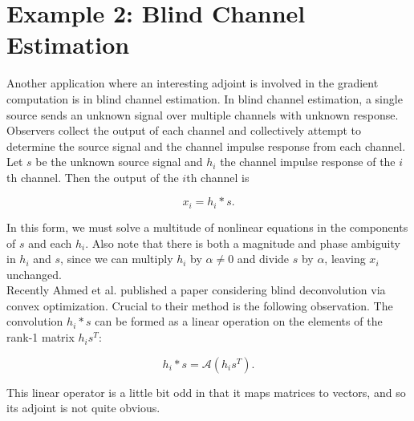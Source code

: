 \documentclass[journal]{IEEEtran}
\begin{document}


\section{Example 2: Blind Channel Estimation}
Another application where an interesting adjoint is involved in the gradient computation is in blind channel estimation.  In blind channel estimation, a single source sends an unknown signal over multiple channels with unknown response.  Observers collect the output of each channel and collectively attempt to determine the source signal and the channel impulse response from each channel.  Let $s$ be the unknown source signal and $h_i$ the channel impulse response of the $i$th channel.  Then the output of the $i$th channel is

\[ x_i = h_i\ast s. \] 

\noindent In this form, we must solve a multitude of nonlinear equations in the components of $s$ and each $h_i$.  Also note that there is both a magnitude and phase ambiguity in $h_i$ and $s$, since we can multiply $h_i$ by $\alpha\neq 0$ and divide $s$ by $\alpha$, leaving $x_i$ unchanged.\\

Recently Ahmed et al. \cite{ahmed_2013} published a paper considering blind deconvolution via convex optimization.  Crucial to their method is the following observation.  The convolution $h_i\ast s$ can be formed as a linear operation on the elements of the rank-1 matrix $h_is^T$:

\[ h_i\ast s = \mathcal{A}(h_is^T). \] 

\noindent This linear operator is a little bit odd in that it maps matrices to vectors, and so its adjoint is not quite obvious.
\end{document}
